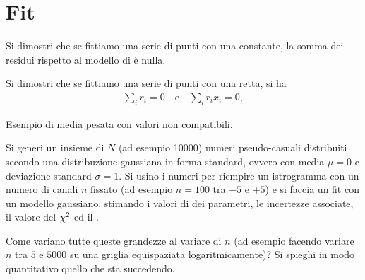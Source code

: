 \chapter{Fit}



\begin{exercise}

Si dimostri che se fittiamo una serie di punti con una constante, la somma dei
residui rispetto al modello di  è nulla.

\end{exercise}



\begin{exercise}

Si dimostri che se fittiamo una serie di punti con una retta, si ha
\begin{align*}
  \sum_i r_i = 0 \quad \text{e} \quad \sum_i r_i x_i = 0,
\end{align*}

\end{exercise}


\begin{solution}


\end{solution}



\begin{exercise}

Esempio di media pesata con valori non compatibili.

\end{exercise}


\begin{solution}


\end{solution}



\begin{exercise}

Si generi un insieme di $N$ (ad esempio 10000) numeri pseudo-casuali distribuiti
secondo una distribuzione gaussiana in forma standard, ovvero con media $\mu = 0$
e deviazione standard $\sigma = 1$. Si usino i numeri per riempire un
istrogramma con un numero di canali $n$ fissato (ad esempio $n = 100$ tra
$-5$ e $+5$) e si faccia un fit con un modello gaussiano, stimando i valori di
 dei parametri, le incertezze associate, il valore del
$\chi^2$ ed il \pvalue.

Come variano tutte queste grandezze al variare di $n$ (ad esempio facendo variare
$n$ tra $5$ e $5000$ su una griglia equispaziata logaritmicamente)? Si spieghi in
modo quantitativo quello che sta succedendo.

\end{exercise}


